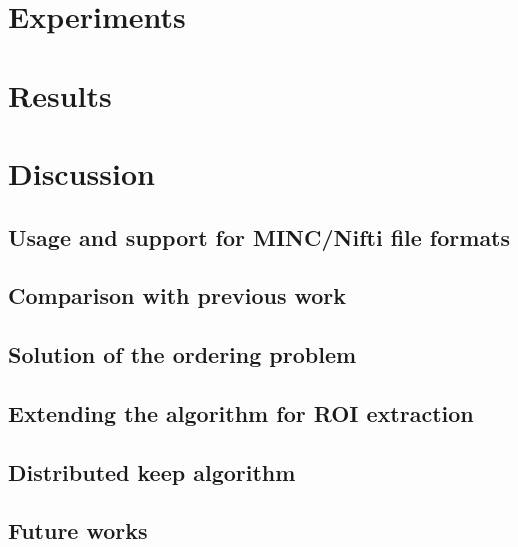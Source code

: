 \documentclass[conference]{IEEEtran}
\begin{document}
\section*{Experiments}


\section*{Results}

\section*{Discussion}

\subsection{Usage and support for MINC/Nifti file formats}
\subsection{Comparison with previous work}
\subsection{Solution of the ordering problem}
\subsection{Extending the algorithm for ROI extraction}
\subsection{Distributed keep algorithm}
\subsection{Future works}
\end{document}
